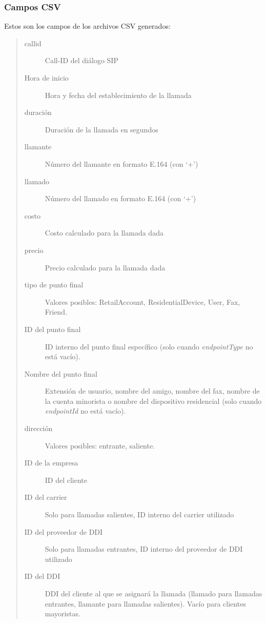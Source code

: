 \documentclass[letterpaper,10pt,spanish]{sphinxmanual}
\begin{document}
\subsubsection{Campos CSV}
\label{administration_portal/brand/calls/call_csv_schedulers:csv-fields}
Estos son los campos de los archivos CSV generados:
\begin{quote}
\begin{description}
\item[{callid}] \leavevmode
Call-ID del diálogo SIP

\item[{Hora de inicio}] \leavevmode
Hora y fecha del establecimiento de la llamada

\item[{duración}] \leavevmode
Duración de la llamada en segundos

\item[{llamante}] \leavevmode
Número del llamante en formato E.164 (con `+')

\item[{llamado}] \leavevmode
Número del llamado en formato E.164 (con `+')

\item[{costo}] \leavevmode
Costo calculado para la llamada dada

\item[{precio}] \leavevmode
Precio calculado para la llamada dada

\item[{tipo de punto final}] \leavevmode
Valores posibles: RetailAccount, ResidentialDevice, User, Fax, Friend.

\item[{ID del punto final}] \leavevmode
ID interno del punto final específico (solo cuando \emph{endpointType} no está vacío).

\item[{Nombre del punto final}] \leavevmode
Extensión de usuario, nombre del amigo, nombre del fax, nombre de la cuenta minorista o nombre del dispositivo residencial (solo cuando \emph{endpointId} no está vacío).

\item[{dirección}] \leavevmode
Valores posibles: entrante, saliente.

\item[{ID de la empresa}] \leavevmode
ID del cliente

\item[{ID del carrier}] \leavevmode
Solo para llamadas salientes, ID interno del carrier utilizado

\item[{ID del proveedor de DDI}] \leavevmode
Solo para llamadas entrantes, ID interno del proveedor de DDI utilizado

\item[{ID del DDI}] \leavevmode
DDI del cliente al que se asignará la llamada (llamado para llamadas entrantes, llamante para llamadas salientes). Vacío para clientes mayoristas.

\end{description}
\end{quote}
\end{document}
